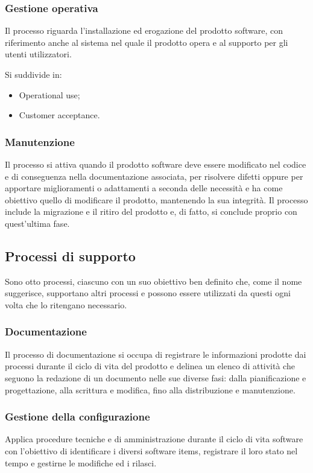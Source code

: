 \subsubsection{Gestione operativa}
Il processo riguarda l'installazione ed erogazione del prodotto software, con riferimento anche al sistema nel quale il prodotto opera e al supporto per gli utenti utilizzatori.
\par Si suddivide in:
\begin{itemize}
    \item Operational use;
    \item Customer acceptance.
\end{itemize}
\subsubsection{Manutenzione}
Il processo si attiva quando il prodotto software deve essere modificato nel codice e di conseguenza nella documentazione associata, per risolvere difetti oppure per apportare miglioramenti o adattamenti a seconda delle necessità e ha come obiettivo quello di modificare il prodotto, mantenendo la sua integrità. Il processo include la migrazione e il ritiro del prodotto e, di fatto, si conclude proprio con quest'ultima fase.

\subsection{Processi di supporto}
Sono otto processi, ciascuno con un suo obiettivo ben definito che, come il nome suggerisce, supportano altri processi e possono essere utilizzati da questi ogni volta che lo ritengano necessario.

\subsubsection{Documentazione}
Il processo di documentazione si occupa di registrare le informazioni prodotte dai processi durante il ciclo di vita del prodotto e delinea un elenco di attività che seguono la redazione di un documento nelle sue diverse fasi: dalla pianificazione e progettazione, alla scrittura e modifica, fino alla distribuzione e manutenzione.
\subsubsection{Gestione della configurazione}
Applica procedure tecniche e di amministrazione durante il ciclo di vita software con l'obiettivo di identificare i diversi software items, registrare il loro stato nel tempo e gestirne le modifiche ed i rilasci.
